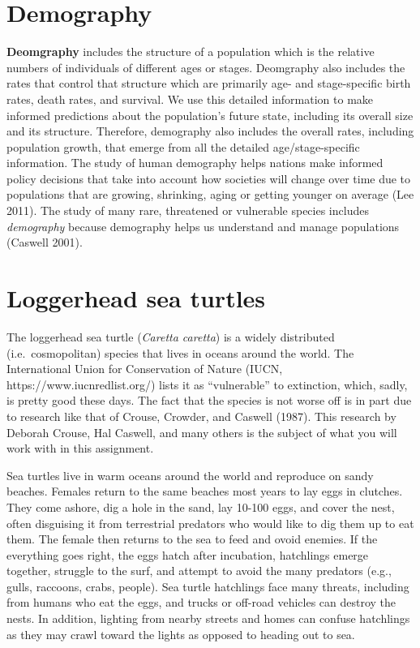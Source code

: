 \documentclass[
  letterpaper,
  DIV=11,
  numbers=noendperiod]{scrreprt}
\begin{document}
\section{Demography}\label{demography}

\textbf{Deomgraphy} includes the structure of a population which is the
relative numbers of individuals of different ages or stages. Deomgraphy
also includes the rates that control that structure which are primarily
age- and stage-specific birth rates, death rates, and survival. We use
this detailed information to make informed predictions about the
population's future state, including its overall size and its structure.
Therefore, demography also includes the overall rates, including
population growth, that emerge from all the detailed age/stage-specific
information. The study of human demography helps nations make informed
policy decisions that take into account how societies will change over
time due to populations that are growing, shrinking, aging or getting
younger on average (Lee 2011). The study of many rare, threatened or
vulnerable species includes \emph{demography} because demography helps
us understand and manage populations (Caswell 2001).

\section{Loggerhead sea turtles}\label{loggerhead-sea-turtles}

The loggerhead sea turtle (\emph{Caretta caretta}) is a widely
distributed (i.e.~cosmopolitan) species that lives in oceans around the
world. The International Union for Conservation of Nature (IUCN,
https://www.iucnredlist.org/) lists it as ``vulnerable'' to extinction,
which, sadly, is pretty good these days. The fact that the species is
not worse off is in part due to research like that of Crouse, Crowder,
and Caswell (1987). This research by Deborah Crouse, Hal Caswell, and
many others is the subject of what you will work with in this
assignment.

Sea turtles live in warm oceans around the world and reproduce on sandy
beaches. Females return to the same beaches most years to lay eggs in
clutches. They come ashore, dig a hole in the sand, lay 10-100 eggs, and
cover the nest, often disguising it from terrestrial predators who would
like to dig them up to eat them. The female then returns to the sea to
feed and ovoid enemies. If the everything goes right, the eggs hatch
after incubation, hatchlings emerge together, struggle to the surf, and
attempt to avoid the many predators (e.g., gulls, raccoons, crabs,
people). Sea turtle hatchlings face many threats, including from humans
who eat the eggs, and trucks or off-road vehicles can destroy the nests.
In addition, lighting from nearby streets and homes can confuse
hatchlings as they may crawl toward the lights as opposed to heading out
to sea.
\end{document}
